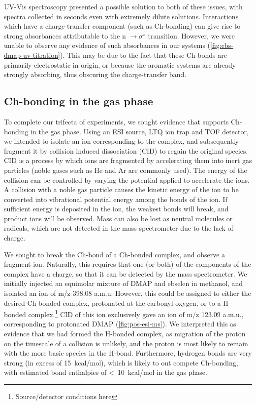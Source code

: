\begin{refsection}
UV-Vis spectroscopy presented a possible solution to both of these issues, with spectra collected in seconds even with extremely dilute solutions.
Interactions which have a charge-transfer component (such as Ch-bonding) can give rise to strong absorbances attributable to the n $\rightarrow \sigma^{\star}$ transition.\autocite{Blackstock1987}
However, we were unable to observe any evidence of such absorbances in our systems (\cref{fig:ebs-dmap-uv-titration}).
This may be due to the fact that these Ch-bonds are primarily electrostatic in origin, or because the aromatic systems are already strongly absorbing, thus obscuring the charge-transfer band.

\subsection{Ch-bonding in the gas phase}
To complete our trifecta of experiments, we sought evidence that supports Ch-bonding in the gas phase.
Using an ESI source, LTQ ion trap and TOF detector, we intended to isolate an ion corresponding to the complex, and subsequently fragment it by collision induced dissociation (CID) to regain the original species.
CID is a process by which ions are fragmented by accelerating them into inert gas particles (noble gases such as He and Ar are commonly used).
The energy of the collision can be controlled by varying the potential applied to accelerate the ions.
A collision with a noble gas particle causes the kinetic energy of the ion to be converted into vibrational potential energy among the bonds of the ion.
If sufficient energy is deposited in the ion, the weakest bonds will break, and product ions will be observed.
Mass can also be lost as neutral molecules or radicals, which are not detected in the mass spectrometer due to the lack of charge.

We sought to break the Ch-bond of a Ch-bonded complex, and observe a fragment ion.
Naturally, this requires that one (or both) of the components of the complex have a charge, so that it can be detected by the mass spectrometer.
We initially injected an equimolar mixture of DMAP and ebselen  in methanol, and isolated an ion of m/z 398.08 a.m.u.
However, this could be assigned to either the desired Ch-bonded complex, protonated at the carbonyl oxygen, or to a H-bonded complex.\footnote{Source/detector conditions here}
CID of this ion exclusively gave an ion of m/z 123.09 a.m.u., corresponding to protonated DMAP (\cref{fig:pos-esi-ms}).
We interpreted this as evidence that we had formed the H-bonded complex, as migration of the proton on the timescale of a collision is unlikely, and the proton is most likely to remain with the more basic species in the H-bond.
Furthermore,  hydrogen bonds are very strong (in excess of 15~kcal/mol)\autocite{Emsley1980}, which is likely to out compete Ch-bonding, with estimated bond enthalpies of <~10~kcal/mol in the gas phase.


\end{refsection}
